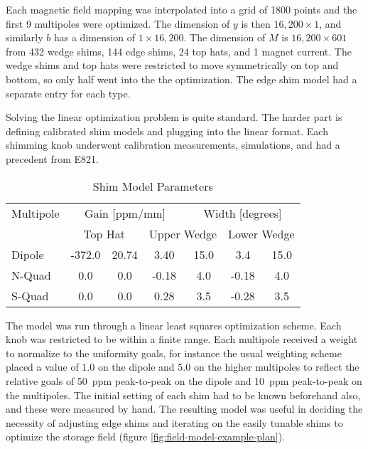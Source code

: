 Each magnetic field mapping was interpolated into a grid of 1800 points and the first 9 multipoles were optimized. The dimension of $y$ is then $16,200 \times 1$, and similarly $b$ has a dimension of $1 \times 16,200$. The dimension of $M$ is $16,200 \times 601$ from 432 wedge shims, 144 edge shims, 24 top hats, and 1 magnet current.  The wedge shims and top hats were restricted to move symmetrically on top and bottom, so only half went into the the optimization.  The edge shim model had a separate entry for each type.

Solving the linear optimization problem is quite standard.  The harder part is defining calibrated shim models and plugging into the linear format. Each shimming knob underwent calibration measurements, simulations, and had a precedent from E821.

\begin{table}[h]
\label{tab:shim-model-params}
\caption{Shim Model Parameters}
\centering
\begin{tabular}{| l | c c | c c | c c |}
    \hline
    Multipole & \multicolumn{3}{c}{Gain [ppm/mm]} & \multicolumn{3}{c}{Width [degrees]} \vline \\
    & \multicolumn{2}{c}{Top Hat} & \multicolumn{2}{c}{Upper Wedge} & \multicolumn{2}{c}{Lower Wedge} \vline \\
    \hline
    Dipole & -372.0 & 20.74 & 3.40  & 15.0  & 3.4 & 15.0 \\
    N-Quad & 0.0    & 0.0   & -0.18 & 4.0 & -0.18 & 4.0  \\
    S-Quad & 0.0    & 0.0   & 0.28  & 3.5 & -0.28 & 3.5  \\
    \hline
\end{tabular}
\end{table}

The model was run through a linear least squares optimization scheme.  Each knob was restricted to be within a finite range.  Each multipole received a weight to normalize to the uniformity goals, for instance the usual weighting scheme placed a value of $1.0$ on the dipole and $5.0$ on the higher multipoles to reflect the relative goals of \SI{50}{ppm} peak-to-peak on the dipole and \SI{10}{ppm} peak-to-peak on the multipoles.  The initial setting of each shim had to be known beforehand also, and these were measured by hand.  The resulting model was useful in deciding the necessity of adjusting edge shims and iterating on the easily tunable shims to optimize the storage field (figure \ref{fig:field-model-example-plan}).

